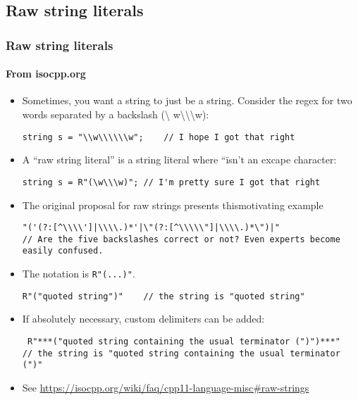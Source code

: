 \subsection{Raw string literals}
\begin{frame}[fragile,t]
\frametitle{Raw string literals}
\framesubtitle{From isocpp.org}
\begin{itemize}[<+->]
\item Sometimes, you want a string to just be a string.  Consider the
  regex for two words separated by a backslash (\textbackslash
  w\textbackslash \textbackslash \textbackslash w):
{\scriptsize\begin{verbatim}
string s = "\\w\\\\\\w";    // I hope I got that right
\end{verbatim}
}
\item A ``raw string literal'' is a string literal where ``\" isn't an
  excape character:
{\scriptsize\begin{verbatim}
string s = R"(\w\\\w)"; // I'm pretty sure I got that right
\end{verbatim}
}
\item The original proposal for raw strings presents thismotivating example
{\scriptsize\begin{verbatim}
"('(?:[^\\\\']|\\\\.)*'|\"(?:[^\\\\\"]|\\\\.)*\")|"
// Are the five backslashes correct or not? Even experts become easily confused.
\end{verbatim}
}
\item The notation is \texttt{R"(...)"}.
{\scriptsize\begin{verbatim}
R"("quoted string")"    // the string is "quoted string"
\end{verbatim}
}
\item If absolutely necessary, custom delimiters can be added:
{\scriptsize\begin{verbatim}
 R"***("quoted string containing the usual terminator (")")***"
// the string is "quoted string containing the usual terminator (")"
\end{verbatim}
}
\vskip 6pt
\item See
  \url{https://isocpp.org/wiki/faq/cpp11-language-misc#raw-strings}
\end{itemize}
\end{frame}


